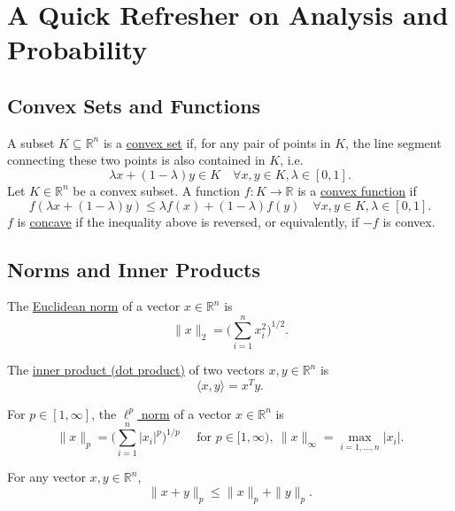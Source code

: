 \section{A Quick Refresher on Analysis and Probability}

\subsection{Convex Sets and Functions}

\begin{definition}[]
A subset $K \subseteq \mathbb{R}^n$ is a \underline{convex set} if, for any pair of points in $K$, the line 
segment connecting these two points is also contained in $K$, i.e. 
\[ \lambda x + (1 - \lambda) y \in K \quad \forall x, y \in K, \lambda \in [0, 1]. \]
Let $K \in \mathbb{R}^n$ be a convex subset. A function $f: K \to \mathbb{R}$ is a \underline{convex 
function} if 
\[ f(\lambda x + (1 - \lambda) y) \leq \lambda f(x) + (1 - \lambda) f(y) \quad \forall x, y \in K, 
\lambda \in [0, 1]. \]	
$f$ is \underline{concave} if the inequality above is reversed, or equivalently, if $-f$ is convex.
\end{definition}


\subsection{Norms and Inner Products}

\begin{definition}[]
The \underline{Euclidean norm} of a vector $x \in \mathbb{R}^n$ is 
\[ \|x\|_2 = \biggl( \sum_{i = 1}^{n} x_i^2 \biggr)^{1/2}. \]
\end{definition}

\begin{definition}[]
The \underline{inner product (dot product)} of two vectors $x, y \in \mathbb{R}^n$ is 
\[ \langle x, y \rangle = x^T y. \]
\end{definition}

\begin{definition}[]
For $p \in [1, \infty]$, the \underline{$\ell^p$ norm} of a vector $x \in \mathbb{R}^n$ is 
\[ \|x\|_p = \biggl( \sum_{i = 1}^{n} |x_i|^p \biggr)^{1/p} \quad \text{ for } p \in [1, \infty), 
\ \|x\|_{\infty} = \max_{i = 1, \dots, n} |x_i|. \]
\end{definition}

\begin{theorem}
For any vector $x, y \in \mathbb{R}^n$, 
\[ \|x + y\|_p \leq \|x\|_p + \|y\|_p. \]
\end{theorem}
